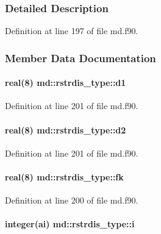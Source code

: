 \subsubsection{Detailed Description}


Definition at line 197 of file md.\-f90.



\subsubsection{Member Data Documentation}
\hypertarget{structmd_1_1rstrdis__type_a931f1a4becaa30529a171b5269846251}{
\paragraph[{d1}]{\setlength{\rightskip}{0pt plus 5cm}real(8) md\-::rstrdis\-\_\-type\-::d1}}\label{structmd_1_1rstrdis__type_a931f1a4becaa30529a171b5269846251}


Definition at line 201 of file md.\-f90.

\hypertarget{structmd_1_1rstrdis__type_a1fc62ab2143ff4a5bf8d2196d23c7320}{
\paragraph[{d2}]{\setlength{\rightskip}{0pt plus 5cm}real(8) md\-::rstrdis\-\_\-type\-::d2}}\label{structmd_1_1rstrdis__type_a1fc62ab2143ff4a5bf8d2196d23c7320}


Definition at line 201 of file md.\-f90.

\hypertarget{structmd_1_1rstrdis__type_a5a5d01615b17d6df557cf703bf33ab3f}{
\paragraph[{fk}]{\setlength{\rightskip}{0pt plus 5cm}real(8) md\-::rstrdis\-\_\-type\-::fk}}\label{structmd_1_1rstrdis__type_a5a5d01615b17d6df557cf703bf33ab3f}


Definition at line 200 of file md.\-f90.

\hypertarget{structmd_1_1rstrdis__type_acf88055c2b7ebaa7187450015fc82340}{
\paragraph[{i}]{\setlength{\rightskip}{0pt plus 5cm}integer(ai) md\-::rstrdis\-\_\-type\-::i}}\label{structmd_1_1rstrdis__type_acf88055c2b7ebaa7187450015fc82340}


